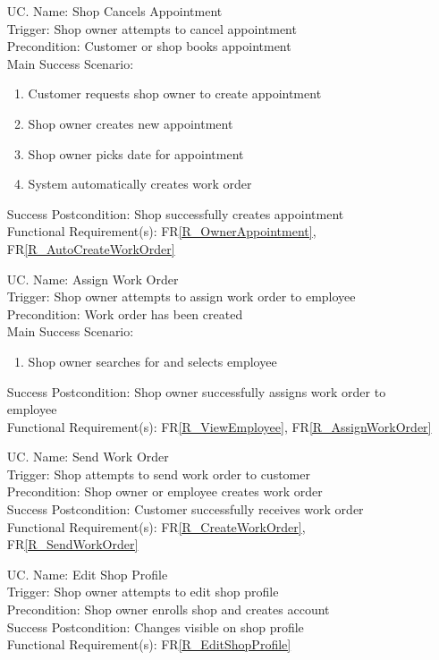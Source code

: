 \documentclass[12pt]{article}
\newcounter{ucnum} %
\begin{document}
\begin{itemize}
\item[UC\refstepcounter{ucnum}\theucnum \label{UC_ShopOwnerBookAppointment}. ]
Name: Shop Cancels Appointment\\
Trigger: Shop owner attempts to cancel appointment\\
Precondition: Customer or shop books appointment\\
Main Success Scenario:
\begin{enumerate}
    \item Customer requests shop owner to create appointment
    \item Shop owner creates new appointment
    \item Shop owner picks date for appointment
    \item System automatically creates work order
\end{enumerate}
Success Postcondition: Shop successfully creates appointment\\
Functional Requirement(s): FR\ref{R_OwnerAppointment}, FR\ref{R_AutoCreateWorkOrder}

\item[UC\refstepcounter{ucnum}\theucnum \label{UC_AssignWorkOrder}. ]
Name: Assign Work Order\\
Trigger: Shop owner attempts to assign work order to employee\\
Precondition: Work order has been created\\
Main Success Scenario:
\begin{enumerate}
    \item Shop owner searches for and selects employee
\end{enumerate}
Success Postcondition: Shop owner successfully assigns work order to employee\\
Functional Requirement(s): FR\ref{R_ViewEmployee}, FR\ref{R_AssignWorkOrder}

\item[UC\refstepcounter{ucnum}\theucnum \label{UC_SendWorkOrder}. ]
Name: Send Work Order\\
Trigger: Shop attempts to send work order to customer\\
Precondition: Shop owner or employee creates work order\\
Success Postcondition: Customer successfully receives work order\\
Functional Requirement(s): FR\ref{R_CreateWorkOrder}, FR\ref{R_SendWorkOrder}

\item[UC\refstepcounter{ucnum}\theucnum \label{UC_EditShopProfile}. ]
Name: Edit Shop Profile\\
Trigger: Shop owner attempts to edit shop profile\\
Precondition: Shop owner enrolls shop and creates account\\
Success Postcondition: Changes visible on shop profile\\
Functional Requirement(s): FR\ref{R_EditShopProfile}


\end{itemize}
\end{document}
